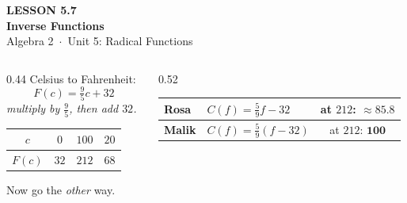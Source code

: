 \documentclass[aspectratio=169, 11pt]{beamer}
\begin{document}
{
\begin{frame}[plain]
  \vspace{2.8cm}\hspace{0.55cm}%
  \begin{minipage}{0.9\textwidth}
    {\color{goldacc}\bfseries\small LESSON 5.7}\\[0.5cm]
    {\color{white}\bfseries\LARGE Inverse Functions}\\[1.2cm]
    {\color{forestmid}\small Algebra 2~$\cdot$~Unit 5: Radical Functions}
  \end{minipage}
\end{frame}
}

\begin{frame}[t, plain]
  \begin{columns}[T]
    \begin{column}{0.44\textwidth}
      \footnotesize
      Celsius to Fahrenheit:
      \[ F(c)=\tfrac{9}{5}c+32 \]
      \emph{multiply by $\tfrac95$, then add $32$.}
      \vspace{4pt}
      \begin{center}
      \renewcommand{\arraystretch}{1.3}
      \begin{tabular}{|c|c|c|c|}
      \hline
      $c$ & $0$ & $100$ & $20$ \\ \hline
      $F(c)$ & $32$ & $212$ & $68$ \\ \hline
      \end{tabular}
      \end{center}
      \vspace{6pt}
      Now go the \emph{other} way.
    \end{column}
    \begin{column}{0.52\textwidth}
      \footnotesize
      \begin{center}
      \renewcommand{\arraystretch}{1.5}
      \begin{tabular}{|l|l|c|}
      \hline
      \textbf{Rosa} & $C(f)=\frac{5}{9}f-32$ & at $212$: $\approx85.8$ \\ \hline
      \textbf{Malik} & $C(f)=\frac{5}{9}(f-32)$ & at $212$: $\mathbf{100}$ \\ \hline
      \end{tabular}
      \end{center}
      \vspace{6pt}

\end{column}
\end{columns}
\end{frame}
\end{document}
